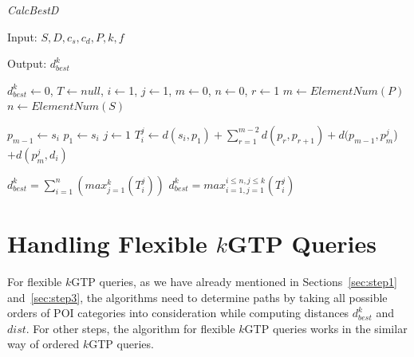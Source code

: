\begin{algorithm}[!htbp] %
 \caption{\emph{CalcBestD}}
 \label{alg:calcd}

Input:  \textit{$S,D,c_s,c_d,P,k,f$} 

Output: \textit{$d_{best}^k$}
 
\begin{algorithmic}[1]
\STATE $d_{best}^k \leftarrow $0, $T \leftarrow null $, $i \leftarrow $1, $j \leftarrow $1, $m \leftarrow 0$, $n \leftarrow $0, $r \leftarrow $1
\STATE $m \leftarrow ElementNum(P)$
\STATE $n \leftarrow ElementNum(S)$

\STATE $p_{m-1} \leftarrow s_i$ 
\STATE $p_1 \leftarrow s_i$
\ENDIF
\STATE $j \leftarrow 1$ 
\STATE $T_i^j \leftarrow d(s_i,p_1) + \sum_{r=1}^{m-2} d(p_r,p_{r+1}) + d(p_{m-1},p_{m}^j$) $ + d(p_m^j,d_i) $
\ENDFOR
\ENDFOR
{}

\STATE $d_{best}^k = \sum_{i=1}^{n} (max_{j=1}^k (T_i^j))$
 \STATE $d_{best}^k = max_{i=1,j=1}^{i \le n,j \le k} (T_i^j)$
\ENDIF

 \end{algorithmic}
 \end{algorithm} 


\section{Handling Flexible $k$GTP Queries}
\label{flxQ}
For flexible $k$GTP queries, as we have already mentioned in Sections~\ref{sec:step1} and~\ref{sec:step3}, the algorithms need to determine paths by taking all possible orders of POI categories into consideration while computing distances $d_{best}^k$ and $dist$. For other steps, the algorithm for flexible $k$GTP queries works in the similar way of ordered $k$GTP queries.






















